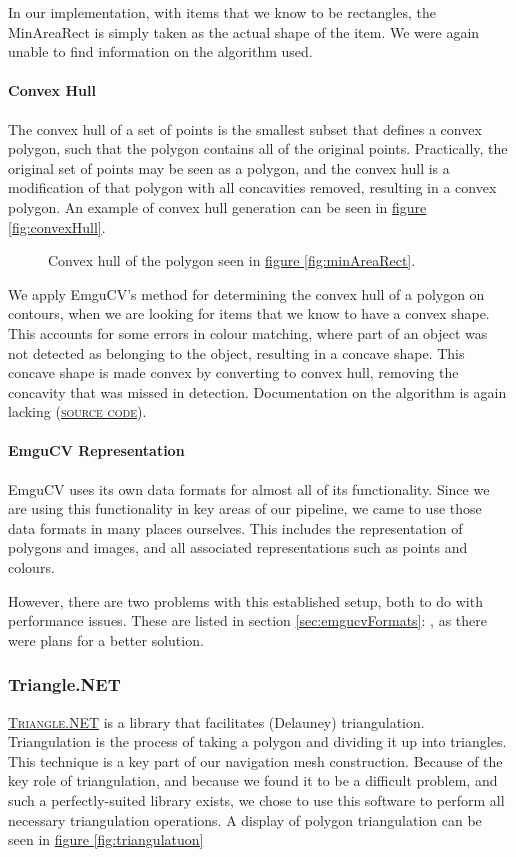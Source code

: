 \documentclass[10pt, abstracton]{scrartcl}
\newcommand{\fref}[1]{\hyperref[#1]{figure \vref{#1}}}
\newcommand{\sref}[1]{section \vref{#1}: \nameref{#1}}
\newcommand{\link}[2]{\textsc{\href{#1}{#2}}}
\begin{document}
In our implementation, with items that we know to be rectangles, the MinAreaRect is simply taken as the actual shape of the item. We were again unable to find information on the algorithm used.

\paragraph{Convex Hull}
The convex hull of a set of points is the smallest subset that defines a convex polygon, such that the polygon contains all of the original points. Practically, the original set of points may be seen as a polygon, and the convex hull is a modification of that polygon with all concavities removed, resulting in a convex polygon. An example of convex hull generation can be seen in \fref{fig:convexHull}.

\begin{figure}
	\centering
	
	\caption{\small Convex hull of the polygon seen in \fref{fig:minAreaRect}.}
	\label{fig:convexHull}
\end{figure}

We apply EmguCV's method for determining the convex hull of a polygon on contours, when we are looking for items that we know to have a convex shape. This accounts for some errors in colour matching, where part of an object was not detected as belonging to the object, resulting in a concave shape. This concave shape is made convex by converting to convex hull, removing the concavity that was missed in detection. Documentation on the algorithm is again lacking (\link{https://github.com/Itseez/opencv/blob/ef91d7e8830c36785f0b6fdbf2045da48413dd76/modules/imgproc/src/convhull.cpp\#L129}{source code}).

\paragraph{EmguCV Representation}
EmguCV uses its own data formats for almost all of its functionality. Since we are using this functionality in key areas of our pipeline, we came to use those data formats in many places ourselves. This includes the representation of polygons and images, and all associated representations such as points and colours.

However, there are two problems with this established setup, both to do with performance issues. These are listed in \sref{sec:emgucvFormats}, as there were plans for a better solution.

\subsubsection{Triangle.NET}
\link{http://triangle.codeplex.com/}{Triangle.NET} is a library that facilitates (Delauney) triangulation. Triangulation is the process of taking a polygon and dividing it up into triangles. This technique is a key part of our navigation mesh construction. Because of the key role of triangulation, and because we found it to be a difficult problem, and such a perfectly-suited library exists, we chose to use this software to perform all necessary triangulation operations. A display of polygon triangulation can be seen in \fref{fig:triangulatuon}
\end{document}
